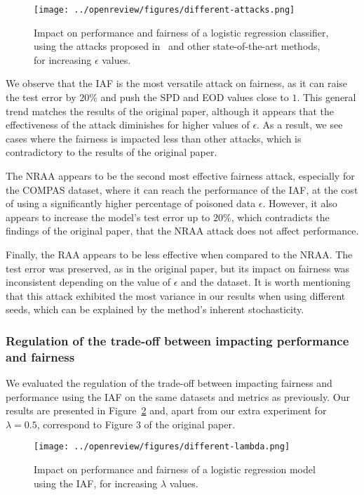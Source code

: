 \begin{figure}[htb!]
    \centering
    \texttt{[image: ../openreview/figures/different-attacks.png]}
    \caption{Impact on performance and fairness of a logistic regression classifier, using the attacks proposed in~\cite{mehrabi2021exacerbating} and other state-of-the-art methods, for increasing $\epsilon$ values.}
    \label{fig:exp-1}
\end{figure}

We observe that the IAF is the most versatile attack on fairness, as it can raise the test error by $20\%$ and push the SPD and EOD values close to $1$. This general trend matches the results of the original paper, although it appears that the effectiveness of the attack diminishes for higher values of $\epsilon$. As a result, we see cases where the fairness is impacted less than other attacks, which is contradictory to the results of the original paper.

The NRAA appears to be the second most effective fairness attack, especially for the COMPAS dataset, where it can reach the performance of the IAF, at the cost of using a significantly higher percentage of poisoned data $\epsilon$. However, it also appears to increase the model's test error up to $20\%$, which contradicts the findings of the original paper, that the NRAA attack does not affect performance.

Finally, the RAA appears to be less effective when compared to the NRAA. The test error was preserved, as in the original paper, but its impact on fairness was inconsistent depending on the value of $\epsilon$ and the dataset. It is worth mentioning that this attack exhibited the most variance in our results when using different seeds, which can be explained by the method's inherent stochasticity.

\subsubsection{Regulation of the trade-off between impacting performance and fairness}
We evaluated the regulation of the trade-off between impacting fairness and performance using the IAF on the same datasets and metrics as previously. Our results are presented in Figure~\ref{fig:exp-2} and, apart from our extra experiment for $\lambda=0.5$, correspond to Figure 3 of the original paper.

\begin{figure}[htb!]
    \centering
    \texttt{[image: ../openreview/figures/different-lambda.png]}
    \caption{Impact on performance and fairness of a logistic regression model using the IAF, for increasing $\lambda$ values.}
    \label{fig:exp-2}
\end{figure}

